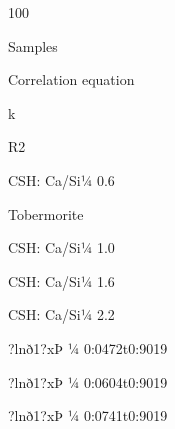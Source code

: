 \documentclass[a4paper,portrait,12pt]{article}
\begin{document}
100





\begin{flushleft}
Samples
\end{flushleft}





\begin{flushleft}
Correlation equation
\end{flushleft}





\begin{flushleft}
k
\end{flushleft}





\begin{flushleft}
R2
\end{flushleft}





\begin{flushleft}
CSH: Ca/Si¼ 0.6
\end{flushleft}


\begin{flushleft}
Tobermorite
\end{flushleft}


\begin{flushleft}
CSH: Ca/Si¼ 1.0
\end{flushleft}


\begin{flushleft}
CSH: Ca/Si¼ 1.6
\end{flushleft}


\begin{flushleft}
CSH: Ca/Si¼ 2.2
\end{flushleft}





\begin{flushleft}
?lnð1?xÞ ¼ 0:0472t0:9019
\end{flushleft}


\begin{flushleft}
?lnð1?xÞ ¼ 0:0604t0:9019
\end{flushleft}


\begin{flushleft}
?lnð1?xÞ ¼ 0:0741t0:9019
\end{flushleft}
\end{document}
